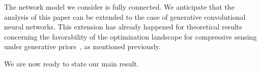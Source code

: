 The network model we consider is fully connected.  We anticipate that the analysis of this paper can be extended to the case of generative convolutional neural networks.  This extension has already happened for theoretical results concerning the favorability of the optimization landscape for compressive sensing under generative priors~\citep{ma2018invertibility}, as mentioned previously. %

\noindent We are now ready to state our main result. %


